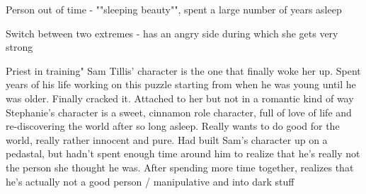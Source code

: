 \documentclass[char]{GL2020}
\begin{document}
\name{\cDisney{}}








Person out of time - ""sleeping beauty"", spent a large number of years asleep

Switch between two extremes - has an angry side during which she gets very strong

Priest in training"	Sam Tillis' character is the one that finally woke her up.  Spent years of his life working on this puzzle starting from when he was young until he was older.  Finally cracked it.  Attached to her but not in a romantic kind of way	Stephanie's character is a sweet, cinnamon role character, full of love of life and re-discovering the world after so long asleep.  Really wants to do good for the world, really rather innocent and pure.  Had built Sam's character up on a pedastal, but hadn't spent enough time around him to realize that he's really not the person she thought he was.  After spending more time together, realizes that he's actually not a good person / manipulative and into dark stuff
\end{document}
